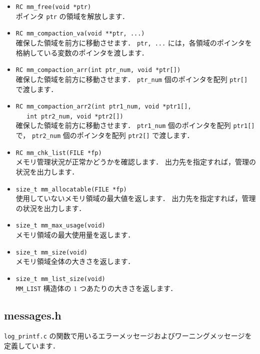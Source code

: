 \begin{itemize}
\item \verb|RC mm_free(void *ptr)| \ \\
ポインタ \verb|ptr| の領域を解放します．

\item \verb|RC mm_compaction_va(void **ptr, ...)| \ \\
確保した領域を前方に移動させます．
\verb|ptr, ...| には，各領域のポインタを格納している変数のポインタを渡します．

\item \verb|RC mm_compaction_arr(int ptr_num, void *ptr[])| \ \\
確保した領域を前方に移動させます．
\verb|ptr_num| 個のポインタを配列 \verb|ptr[]| で渡します．

\item \verb|RC mm_compaction_arr2(int ptr1_num, void *ptr1[], | \\
	\verb|   int ptr2_num, void *ptr2[])| \ \\
確保した領域を前方に移動させます．
\verb|ptr1_num| 個のポインタを配列 \verb|ptr1[]| で，
\verb|ptr2_num| 個のポインタを配列 \verb|ptr2[]| で渡します．

\item \verb|RC mm_chk_list(FILE *fp)| \ \\
メモリ管理状況が正常かどうかを確認します．
出力先を指定すれば，管理の状況を出力します．

\item \verb|size_t mm_allocatable(FILE *fp)| \ \\
使用していないメモリ領域の最大値を返します．
出力先を指定すれば，管理の状況を出力します．

\item \verb|size_t mm_max_usage(void)| \ \\
メモリ領域の最大使用量を返します．

\item \verb|size_t mm_size(void)| \ \\
メモリ領域全体の大きさを返します．

\item \verb|size_t mm_list_size(void)| \ \\
\verb|MM_LIST| 構造体の $1$ つあたりの大きさを返します．
\end{itemize}


\subsection{messages.h}
\verb|log_printf.c| の関数で用いるエラーメッセージおよびワーニングメッセージを
定義しています．

